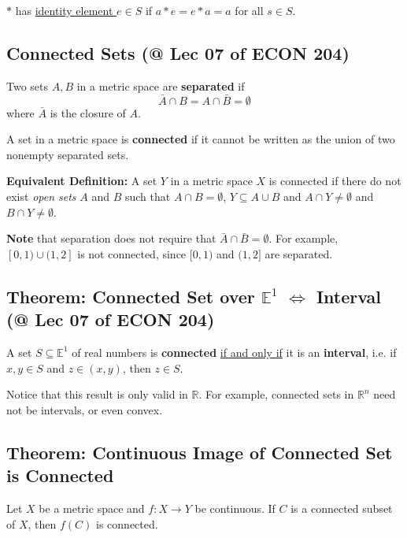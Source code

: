 \documentclass[11pt]{elegantbook}
\begin{document}
\begin{definition}
$*$ has \underline{identity element $e\in S$} if $a*e=e*a=a$ for all $s\in S$.
\end{definition}

\subsection{Connected Sets \small{(@ Lec 07 of ECON 204)}}
\begin{definition}
    \normalfont
    Two sets $A, B$ in a metric space are \textbf{separated} if $$\bar{A}\cap B=A\cap\bar{B}=\emptyset$$
    where $\bar{A}$ is the closure of $A$.

    A set in a metric space is \textbf{connected} if it cannot be written as the union of two nonempty separated sets.
\end{definition}
\textbf{Equivalent Definition:} A set $Y$ in a metric space $X$ is connected if there do not exist \textit{open sets} $A$ and $B$ such that $A \cap B = \emptyset$, $Y \subseteq A\cup B$ and $A \cap Y \neq \emptyset$ and $B \cap Y \neq \emptyset$.

\textbf{Note} that separation does not require that $\bar{A}\cap\bar{B}=\emptyset$. For example, $[0,1)\cup(1,2]$ is not connected, since $[0,1)$ and $(1,2]$ are separated.

\subsection{Theorem: Connected Set over $\mathbb{E}^1$ $\Leftrightarrow$ Interval \small{(@ Lec 07 of ECON 204)}}
\begin{theorem}
    A set $S \subseteq \mathbb{E}^1$ of real numbers is \textbf{connected} \underline{if and only if} it is an \textbf{interval}, i.e. if $x, y \in S$ and $z \in (x, y)$, then $z \in S$.
\end{theorem}
Notice that this result is only valid in $\mathbb{R}$. For example, connected sets in $\mathbb{R}^n$ need not be intervals, or even convex.

\subsection{Theorem: Continuous Image of Connected Set is Connected}
\begin{theorem}
    Let $X$ be a metric space and $f : X \rightarrow Y$ be continuous. If $C$ is a connected subset of $X$, then $f(C)$ is connected.
\end{theorem}
\end{document}
